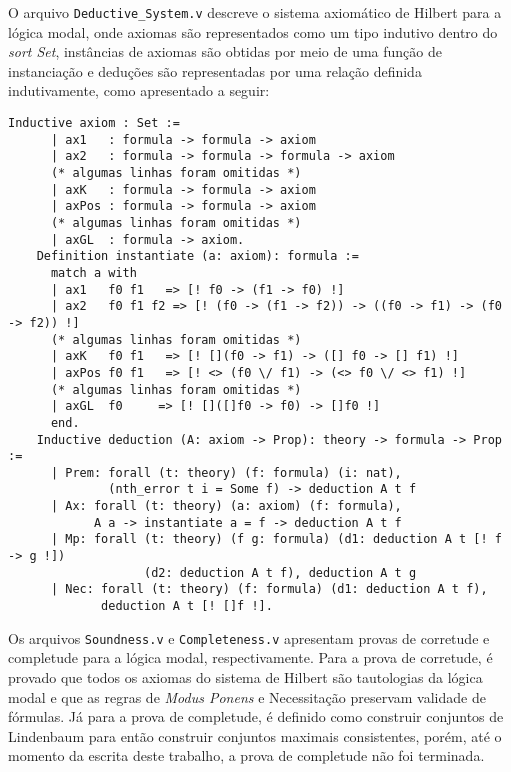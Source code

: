         O arquivo \texttt{Deductive\_System.v} descreve o sistema axiomático de Hilbert para a lógica modal, onde axiomas são representados
        como um tipo indutivo dentro do \textit{sort Set}, instâncias de axiomas são obtidas por meio de uma função de instanciação e
        deduções são representadas por uma relação definida indutivamente, como apresentado a seguir:
        \begin{lstlisting}[language=coq]
    Inductive axiom : Set :=
      | ax1   : formula -> formula -> axiom
      | ax2   : formula -> formula -> formula -> axiom
      (* algumas linhas foram omitidas *)
      | axK   : formula -> formula -> axiom
      | axPos : formula -> formula -> axiom
      (* algumas linhas foram omitidas *)
      | axGL  : formula -> axiom.
    Definition instantiate (a: axiom): formula :=
      match a with
      | ax1   f0 f1   => [! f0 -> (f1 -> f0) !]
      | ax2   f0 f1 f2 => [! (f0 -> (f1 -> f2)) -> ((f0 -> f1) -> (f0 -> f2)) !]
      (* algumas linhas foram omitidas *)
      | axK   f0 f1   => [! [](f0 -> f1) -> ([] f0 -> [] f1) !]
      | axPos f0 f1   => [! <> (f0 \/ f1) -> (<> f0 \/ <> f1) !]
      (* algumas linhas foram omitidas *)
      | axGL  f0     => [! []([]f0 -> f0) -> []f0 !]
      end.
    Inductive deduction (A: axiom -> Prop): theory -> formula -> Prop :=
      | Prem: forall (t: theory) (f: formula) (i: nat),
              (nth_error t i = Some f) -> deduction A t f
      | Ax: forall (t: theory) (a: axiom) (f: formula),
            A a -> instantiate a = f -> deduction A t f
      | Mp: forall (t: theory) (f g: formula) (d1: deduction A t [! f -> g !])
                   (d2: deduction A t f), deduction A t g
      | Nec: forall (t: theory) (f: formula) (d1: deduction A t f),
             deduction A t [! []f !].
        \end{lstlisting}

        Os arquivos \texttt{Soundness.v} e \texttt{Completeness.v} apresentam provas de corretude e completude para a lógica modal,
        respectivamente. Para a prova de corretude, é provado que todos os axiomas do sistema de Hilbert são tautologias da lógica modal
        e que as regras de \textit{Modus Ponens} e Necessitação preservam validade de fórmulas. Já para a prova de completude, é
        definido como construir conjuntos de Lindenbaum para então construir conjuntos maximais consistentes, porém, até o momento
        da escrita deste trabalho, a prova de completude não foi terminada.

